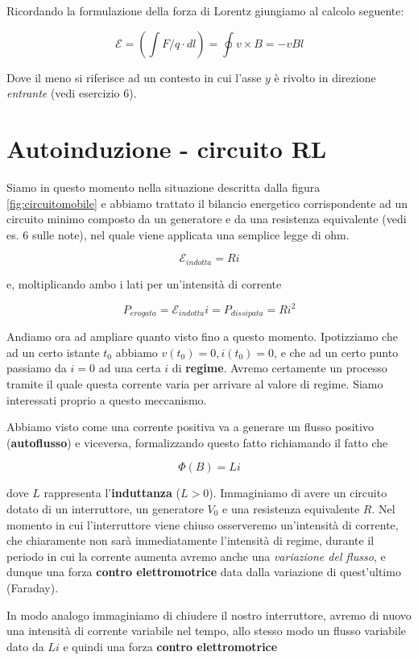 Ricordando la formulazione della forza di Lorentz giungiamo al calcolo seguente: 

$$
\mathcal{E} = \left(\int F/q \cdot dl\right) = \oint v \times B = -vBl
$$

Dove il meno si riferisce ad un contesto in cui l'asse $y$ è rivolto in direzione \textit{entrante} (vedi esercizio 6).

\section{Autoinduzione - circuito RL}
Siamo in questo momento nella situazione descritta dalla figura \ref{fig:circuitomobile} e abbiamo trattato il bilancio energetico corrispondente ad un circuito minimo composto da un generatore e da una resistenza equivalente (vedi es. 6 sulle note), nel quale viene applicata una semplice legge di ohm.

$$
\mathcal{E}_{indotta} = Ri
$$

e, moltiplicando ambo i lati per un'intensità di corrente

$$ 
P_{erogata} = \mathcal{E}_{indotta}i  = P_{dissipata} = Ri^2
$$

Andiamo ora ad ampliare quanto visto fino a questo momento. Ipotizziamo che ad un certo istante $t_0$ abbiamo $v(t_0) = 0, i(t_0) = 0$, e che ad un certo punto passiamo da $i = 0$ ad una certa $i$ di \textbf{regime}. Avremo certamente un processo tramite il quale questa corrente varia per arrivare al valore di regime. Siamo interessati proprio a questo meccanismo. 

Abbiamo visto come una corrente positiva va a generare un flusso positivo (\textbf{autoflusso}) e viceversa, formalizzando questo fatto richiamando il fatto che 

$$
\Phi(B) = Li
$$

dove $L$ rappresenta l'\textbf{induttanza} ($L > 0$). 
Immaginiamo di avere un circuito dotato di un interruttore, un generatore $V_0$ e una resistenza equivalente $R$. Nel momento in cui l'interruttore viene chiuso osserveremo un'intensità di corrente, che chiaramente non sarà immediatamente l'intensità di regime, durante il periodo in cui la corrente aumenta avremo anche una \textit{variazione del flusso}, e dunque una forza \textbf{contro elettromotrice} data dalla variazione di quest'ultimo (Faraday).

In modo analogo immaginiamo di chiudere il nostro interruttore, avremo di nuovo una intensità di corrente variabile nel tempo, allo stesso modo un flusso variabile dato da $Li$ e quindi una forza \textbf{contro elettromotrice} 


